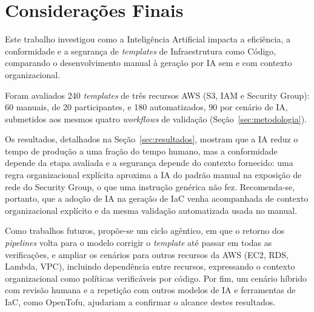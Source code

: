 \section{Considerações Finais}
\label{sec:conclusao}

Este trabalho investigou como a Inteligência Artificial impacta a eficiência, a conformidade e a segurança de \textit{templates} de Infraestrutura como Código, comparando o desenvolvimento manual à geração por IA sem e com contexto organizacional.

Foram avaliados 240 \textit{templates} de três recursos AWS (S3, IAM e Security Group): 60 manuais, de 20 participantes, e 180 automatizados, 90 por cenário de IA, submetidos aos mesmos quatro \textit{workflows} de validação (Seção~\ref{sec:metodologia}).

Os resultados, detalhados na Seção~\ref{sec:resultados}, mostram que a IA reduz o tempo de produção a uma fração do tempo humano, mas a conformidade depende da etapa avaliada e a segurança depende do contexto fornecido: uma regra organizacional explícita aproxima a IA do padrão manual na exposição de rede do Security Group, o que uma instrução genérica não fez. Recomenda-se, portanto, que a adoção de IA na geração de IaC venha acompanhada de contexto organizacional explícito e da mesma validação automatizada usada no manual.

Como trabalhos futuros, propõe-se um ciclo agêntico, em que o retorno dos \textit{pipelines} volta para o modelo corrigir o \textit{template} até passar em todas as verificações, e ampliar os cenários para outros recursos da AWS (EC2, RDS, Lambda, VPC), incluindo dependência entre recursos, expressando o contexto organizacional como políticas verificáveis por código. Por fim, um cenário híbrido com revisão humana e a repetição com outros modelos de IA e ferramentas de IaC, como OpenTofu, ajudariam a confirmar o alcance destes resultados.
